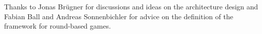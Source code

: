 \thispagestyle{empty}
Thanks to Jonas Brügner for discussions and ideas on the architecture design and Fabian Ball and Andreas Sonnenbichler for advice on the definition of the framework for round-based games.